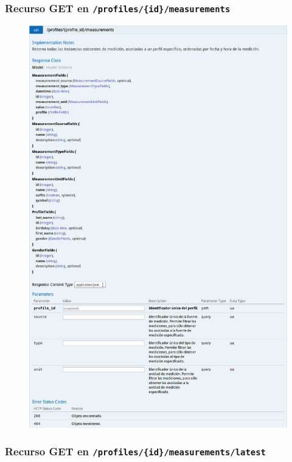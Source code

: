 \newpage


\subsubsection{Recurso GET en \texttt{/profiles/\{id\}/measurements}}

\begin{figure}[h]
  \centering
  \includegraphics[width=\textwidth,height=.75\textheight,keepaspectratio]{img/especificacion_api/profileMeasurementList_get}
  \label{profileMeasurementList_get}
\end{figure}

\newpage


\subsubsection{Recurso GET en \texttt{/profiles/\{id\}/measurements/latest}}

